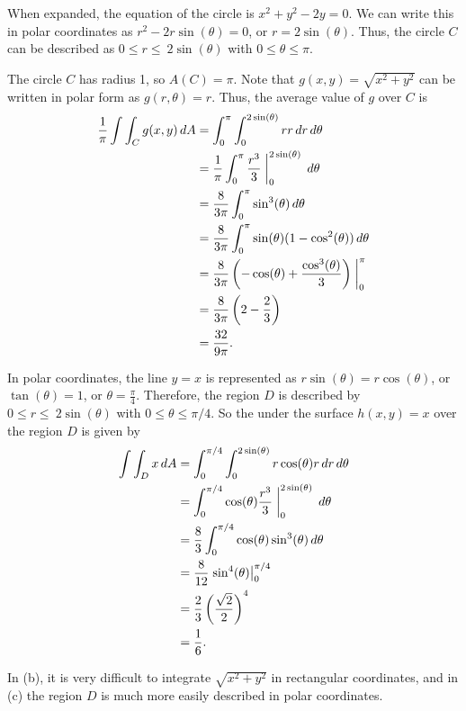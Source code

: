 \begin{activitySolution}
\ba
\item When expanded, the equation of the circle is $x^2+y^2 - 2y = 0$. We can write this in polar coordinates as $r^2 - 2r \sin(\theta) = 0$, or $r = 2\sin(\theta)$.  Thus, the circle $C$ can be described as $0 \leq r \leq \ 2\sin(\theta)$ with $0 \leq \theta \leq \pi$. 

\item The circle $C$ has radius 1, so $A(C) = \pi$. Note that $g(x,y) = \sqrt{x^2 + y^2}$ can be written in polar form as $g(r,\theta) = r$. Thus, the average value of $g$ over $C$ is 
\begin{align*}
\frac{1}{\pi}\int \int_C g(x,y) \, dA &= \int_{0}^{\pi} \int_{0}^{2\sin(\theta)} r r \, dr \, d \theta \\
	&= \frac{1}{\pi}\int_{0}^{\pi} \frac{r^3}{3} \biggm|_{0}^{2\sin(\theta)} \, d \theta \\
	&= \frac{8}{3\pi} \int_{0}^{\pi} \sin^3(\theta) \, d \theta \\
	&= \frac{8}{3\pi} \int_{0}^{\pi} \sin(\theta)(1-\cos^2(\theta)) \, d \theta \\
	&= \frac{8}{3\pi} \left(-\cos(\theta)+\frac{\cos^3(\theta)}{3}\right)\biggm|_{0}^{\pi}   \\
	&= \frac{8}{3\pi}\left(2-\frac{2}{3}\right) \\
	&= \frac{32}{9\pi}.
\end{align*}

\item In polar coordinates, the line $y=x$ is represented as $r \sin(\theta) = r \cos(\theta)$, or $\tan(\theta) = 1$, or $\theta = \frac{\pi}{4}$. Therefore, the region $D$ is described by $0 \leq r \leq \ 2\sin(\theta)$ with $0 \leq \theta \leq \pi/4$. So the under the surface $h(x,y) = x$ over the region $D$ is given by
\begin{align*}
\int \int_D x \, dA &= \int_{0}^{\pi/4} \int_{0}^{2\sin(\theta)} r\cos(\theta) r \, dr \, d \theta \\
	&= \int_{0}^{\pi/4} \cos(\theta) \frac{r^3}{3} \biggm|_{0}^{2\sin(\theta)} \, d \theta \\
	&= \frac{8}{3} \int_{0}^{\pi/4} \cos(\theta) \sin^3(\theta) \, d \theta \\
	&= \frac{8}{12} \left. \sin^4(\theta) \right|_{0}^{\pi/4}  \\
	&= \frac{2}{3} \left(\frac{\sqrt{2}}{2}\right)^4  \\
	&= \frac{1}{6}.
\end{align*} 

\item In (b), it is very difficult to integrate $\sqrt{x^2+y^2}$ in rectangular coordinates, and in (c) the region $D$ is much more easily described in polar coordinates. 

\ea

\end{activitySolution}
\aftera
